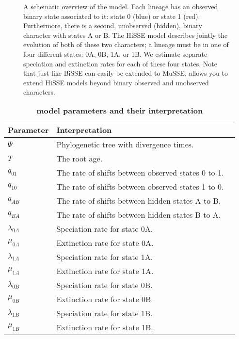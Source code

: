 \begin{figure}[h!]
\centering
{}
\caption{\small A schematic overview of the \HiSSE model. Each lineage has an observed binary state associated to it: state 0 (blue) or state 1 (red). 
Furthermore, there is a second, unobserved (hidden), binary character with states A or B.
The HiSSE model describes jointly the evolution of both of these two characters; a lineage
    must be in one of four different states: 0A, 0B, 1A, or 1B.
    We estimate separate speciation and extinction rates for each of these four states.
    Note that just like BiSSE can easily be extended to MuSSE,
    \RevBayes allows you to extend HiSSE models beyond binary observed and unobserved characters.}
\label{fig:HiSSE_Schematic}
\end{figure}

\begin{table}[t!]
	\centering
	\caption{\bf{\HiSSE model parameters and their interpretation}} \label{tab:Hparam}
	\begin{tabular}{ l l l }
		\toprule
		Parameter & Interpretation \\
		\midrule
		$\Psi$ & Phylogenetic tree with divergence times.\\
		\rowcolor{gray!15} $T$ & The root age.\\
		$q_{01}$ & The rate of shifts between observed states 0 to 1.\\
		\rowcolor{gray!15} $q_{10}$ & The rate of shifts between observed states 1 to 0.\\
		$q_{AB}$ & The rate of shifts between hidden states A to B.\\
		\rowcolor{gray!15} $q_{BA}$ & The rate of shifts between hidden states B to A.\\
        $\lambda_{0A}$ & Speciation rate for state 0A.\\
        \rowcolor{gray!15} $\mu_{0A}$ & Extinction rate for state 0A.\\
        $\lambda_{1A}$ & Speciation rate for state 1A.\\
        \rowcolor{gray!15} $\mu_{1A}$ & Extinction rate for state 1A.\\
        $\lambda_{0B}$ & Speciation rate for state 0B.\\
        \rowcolor{gray!15} $\mu_{0B}$ & Extinction rate for state 0B.\\
        $\lambda_{1B}$ & Speciation rate for state 1B.\\
        \rowcolor{gray!15} $\mu_{1B}$ & Extinction rate for state 1B.\\
	\end{tabular}
\end{table}


